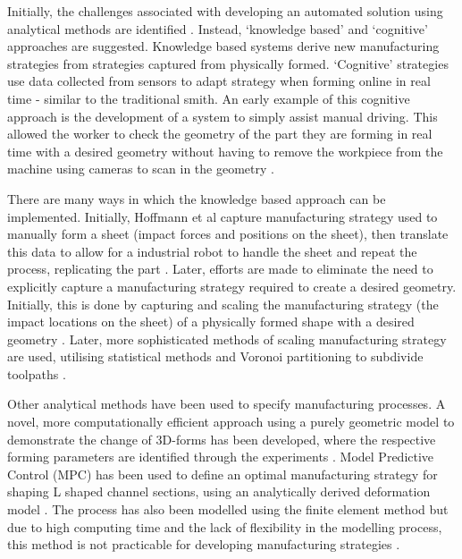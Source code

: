 Initially, the challenges associated with developing an automated solution using analytical methods are identified \citep{Golle2007DrivingProducts}. Instead, `knowledge based' and `cognitive' approaches are suggested. Knowledge based systems derive new manufacturing strategies from strategies captured from physically formed. `Cognitive' strategies use data collected from sensors to adapt strategy when forming online in real time - similar to the traditional smith. An early example of this cognitive approach is the development of a system to simply assist manual driving. This allowed the worker to check the geometry of the part they are forming in real time with a desired geometry without having to remove the workpiece from the machine using cameras to scan in the geometry \citep{Scherer2010DrivingProducts}.

There are many ways in which the knowledge based approach can be implemented. Initially, Hoffmann et al capture manufacturing strategy used to manually form a sheet (impact forces and positions on the sheet), then translate this data to allow for a industrial robot to handle the sheet and repeat the process, replicating the part  \citep{Hoffman2009AnHandling}. %
Later, efforts are made to eliminate the need to explicitly capture a manufacturing strategy required to create a desired geometry. Initially, this is done by capturing and scaling the manufacturing strategy (the impact locations on the sheet) of a physically formed shape with a desired geometry \citep{Opritescu2012AutomatedStrategy}. %
Later, more sophisticated methods of scaling manufacturing strategy are used, utilising statistical methods \citep{Opritescu2016VariationVariance}  and Voronoi partitioning to subdivide toolpaths \citep{Hartmann2019Knowledge-basedPartitioning}. %

Other analytical methods have been used to specify manufacturing processes. A novel, more computationally efficient approach using a purely geometric model to demonstrate the change of 3D-forms has been developed, where the respective forming parameters are identified through the experiments \citep{Yang2011GeometricalProcess}. Model Predictive Control (MPC) has been used to define an optimal manufacturing strategy for shaping L shaped channel sections, using an analytically derived deformation model \citep{Yang2009AutomatisierungProgramming}. The process has also been modelled using the finite element method \citep{Hoffmann2005StudiesMetal} but due to high computing time and the lack of flexibility in the modelling process, this method is not practicable for developing manufacturing strategies \citep{Scherer2013MethodenBlechumformung}.

